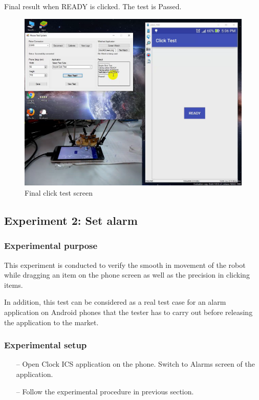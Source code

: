 Final result when READY is clicked. The test is Passed.
	\begin{figure}[H]
		\centering
		\includegraphics[scale=0.5]{Chapters/Fig/click_final.png}
		\caption{Final click test screen}
		\label{fig:click_final}
	\end{figure}

\subsection{Experiment 2: Set alarm}
\subsubsection{Experimental purpose}
This experiment is conducted to verify the smooth in movement of the robot while dragging an item on the phone screen as well as the precision in clicking items.

In addition, this test can be considered as a real test case for an alarm application on Android phones that the tester has to carry out before releasing the application to the market.

\subsubsection{Experimental setup}
	\begin{itemize}
		\item[--]Open Clock ICS application on the phone. Switch to Alarms screen of the application.
		\item[--]Follow the experimental procedure in previous section.
	\end{itemize}

